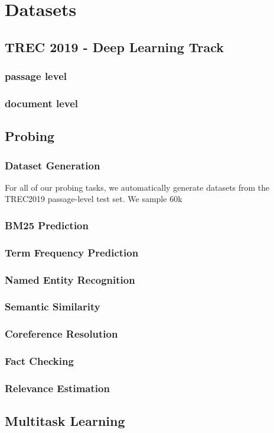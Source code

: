 \chapter{Datasets}
\label{chap:datasets}
\section{TREC 2019 - Deep Learning Track}
\label{sec:trec2019}
\subsection{passage level}
\subsection{document level}

\section{Probing}

\subsection{Dataset Generation}
\label{sec:dataset_gen}
For all of our probing tasks, we automatically generate datasets from the TREC2019 passage-level test set. We sample $60$k 

\subsection{BM25 Prediction}

\subsection{Term Frequency Prediction}

\subsection{Named Entity Recognition}

\subsection{Semantic Similarity}

\subsection{Coreference Resolution}

\subsection{Fact Checking}

\subsection{Relevance Estimation}

\section{Multitask Learning}
